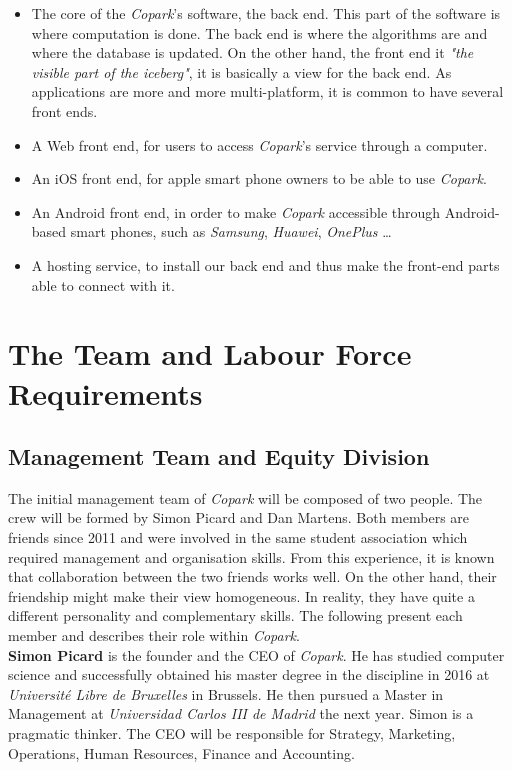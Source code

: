 \documentclass[12pt,a4paper,oneside]{book}
\newcommand{\bp}{\textit{Copark}}
\begin{document}
\begin{itemize}
\item The core of the \bp{}'s software, the back end. This part of the software is where computation is done. The back end is where the algorithms are and where the database is updated. On the other hand, the front end it \textit{"the visible part of the iceberg"}, it is basically a view for the back end. As applications are more and more multi-platform, it is common to have several front ends.

\item A Web front end, for users to access \bp{}'s service through a computer.

\item An iOS front end, for apple smart phone owners to be able to use \bp{}.

\item An Android front end, in order to make \bp{} accessible through Android-based smart phones, such as \textit{Samsung}, \textit{Huawei}, \textit{OnePlus} …

\item A hosting service, to install our back end and thus make the front-end parts able to connect with it.
\end{itemize}

\section{The Team and Labour Force Requirements}
\subsection{Management Team and Equity Division}
The initial management team of \bp{} will be composed of two people. The crew will be formed by Simon Picard and Dan Martens. Both members are friends since 2011 and were involved in the same student association which required management and organisation skills. From this experience, it is known that collaboration between the two friends works well. On the other hand, their friendship might make their view homogeneous. In reality, they have quite a different personality and complementary skills. The following present each member and describes their role within \bp{}.\\

\textbf{Simon Picard} is the founder and the CEO of \bp{}. He has studied computer science and successfully obtained his master degree in the discipline in 2016 at \textit{Université Libre de Bruxelles} in Brussels. He then pursued a Master in Management at \textit{Universidad Carlos III de Madrid} the next year. Simon is a pragmatic thinker. The CEO will be responsible for Strategy, Marketing, Operations, Human Resources, Finance and Accounting.\\
\end{document}

